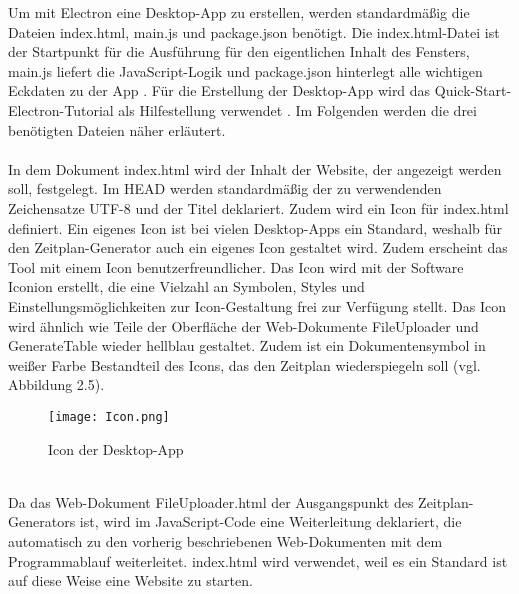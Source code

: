 Um mit Electron eine Desktop-App zu erstellen, werden standardmäßig die Dateien index.html, main.js und package.json benötigt. Die index.html-Datei ist der Startpunkt für die Ausführung für den eigentlichen Inhalt des Fensters, main.js liefert die JavaScript-Logik und package.json hinterlegt alle wichtigen Eckdaten zu der App \cite{electron}. Für die Erstellung der Desktop-App wird das Quick-Start-Electron-Tutorial als Hilfestellung verwendet \cite{electron2}. Im Folgenden werden die drei benötigten Dateien näher erläutert.\\
\\
In dem Dokument index.html wird der Inhalt der Website, der angezeigt werden soll, festgelegt.
Im HEAD werden standardmäßig der zu verwendenden Zeichensatze UTF-8 und der Titel deklariert. Zudem wird ein Icon für index.html definiert. Ein eigenes Icon ist bei vielen Desktop-Apps ein Standard, weshalb für den Zeitplan-Generator auch ein eigenes Icon gestaltet wird. Zudem erscheint das Tool mit einem Icon benutzerfreundlicher. Das Icon wird mit der Software Iconion erstellt, die eine Vielzahl an Symbolen, Styles und Einstellungsmöglichkeiten zur Icon-Gestaltung frei zur Verfügung stellt.  Das Icon wird ähnlich wie Teile der Oberfläche der Web-Dokumente FileUploader und GenerateTable wieder hellblau gestaltet. Zudem ist ein Dokumentensymbol in weißer Farbe Bestandteil des Icons, das den Zeitplan wiederspiegeln soll (vgl. Abbildung 2.5).
\begin{figure}[htbp]
  \centering
  \texttt{[image: Icon.png]}
  \caption{Icon der Desktop-App}
  \label{fig:Fig1}
\end{figure}\\
Da das Web-Dokument FileUploader.html der Ausgangspunkt des Zeitplan-Generators ist, wird im JavaScript-Code eine Weiterleitung deklariert, die automatisch zu den vorherig beschriebenen Web-Dokumenten mit dem Programmablauf weiterleitet. index.html wird verwendet, weil es ein Standard ist auf diese Weise eine Website zu starten. 
